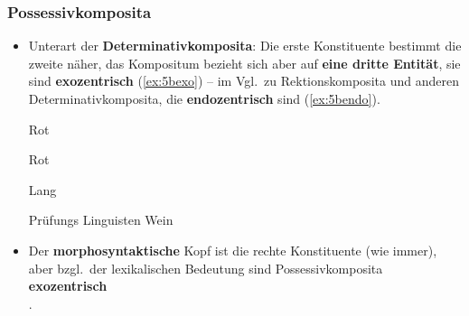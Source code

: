 \begin{frame}
\frametitle{Possessivkomposita}

\begin{itemize}
	\item Unterart der \textbf{Determinativkomposita}: Die erste Konstituente bestimmt die zweite näher, das Kompositum bezieht sich aber auf \textbf{eine dritte Entität}, sie sind \textbf{exozentrisch} (\ref{ex:5bexo}) -- im Vgl.\ zu Rektionskomposita und anderen Determinativkomposita, die \textbf{endozentrisch} sind (\ref{ex:5bendo}).
	
	\settowidth{} 
	\ea\label{ex:5bexo}
		\ea Rot 

	
		\ex Rot 
	
		\ex Lang 
		\z

	
	\ex \label{ex:5bendo}
		\ea Prüfungs 
		\ex Linguisten 
		\ex Wein 
		\z 
	\z 

\pause 

	\item Der \textbf{morphosyntaktische} Kopf ist die rechte Konstituente (wie immer), aber bzgl.\ der lexikalischen Bedeutung sind Possessivkomposita \textbf{exozentrisch}\\
	\citep[vgl.][]{Fries&MyP16j}.
	
\end{itemize}

\end{frame}



